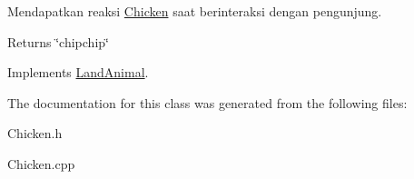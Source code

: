 Mendapatkan reaksi \hyperlink{classChicken}{Chicken} saat berinteraksi dengan pengunjung. 

\begin{DoxyReturn}{Returns}
\char`\"{}chipchip\char`\"{} 
\end{DoxyReturn}


Implements \hyperlink{classLandAnimal}{Land\-Animal}.



The documentation for this class was generated from the following files\-:\begin{DoxyCompactItemize}
\item 
Chicken.\-h\item 
Chicken.\-cpp\end{DoxyCompactItemize}
